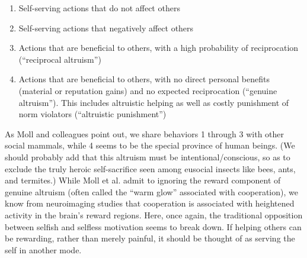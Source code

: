 \documentclass[a4paper,14pt]{extarticle}
\begin{document}
\begin{enumerate}
      \item
            Self-serving actions that do not affect others
      \item
            Self-serving actions that negatively affect others
      \item
            Actions that are beneficial to others, with a high probability of reciprocation (``reciprocal altruism'')
      \item
            Actions that are beneficial to others, with no direct personal benefits (material or reputation gains) and no expected reciprocation (``genuine altruism'').
            This includes altruistic helping as well as costly punishment of norm violators (``altruistic punishment'')
\end{enumerate}

As Moll and colleagues point out, we share behaviors 1 through 3 with other social mammals, while 4 seems to be the special province of human beings.
(We should probably add that this altruism must be intentional/conscious, so as to exclude the truly heroic self-sacrifice seen among eusocial insects like bees, ants, and termites.)
While Moll et al. admit to ignoring the reward component of genuine altruism (often called the ``warm glow'' associated with cooperation), we know from neuroimaging studies that cooperation is associated with heightened activity in the brain's reward regions.
Here, once again, the traditional opposition between selfish and selfless motivation seems to break down.
If helping others can be rewarding, rather than merely painful, it should be thought of as serving the self in another mode.
\end{document}
